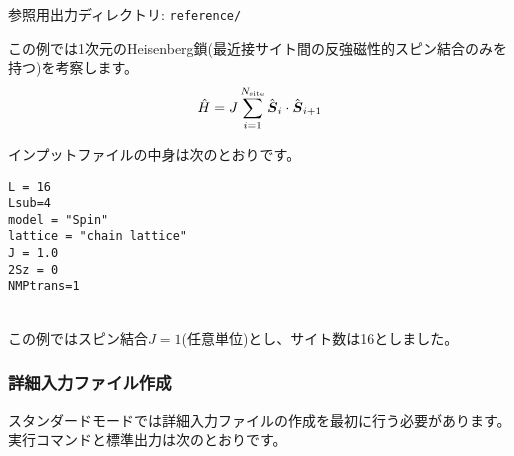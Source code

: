 参照用出力ディレクトリ: \verb|reference/|

この例では1次元のHeisenberg鎖(最近接サイト間の反強磁性的スピン結合のみを持つ)を考察します。
\begin{align}
  {\hat H} = J \sum_{i=1}^{N_{\rm site}} {\hat {\boldsymbol S}}_i \cdot {\hat {\boldsymbol S}}_{i+1}
\end{align}

インプットファイルの中身は次のとおりです。
\\
\begin{minipage}{10cm}
\begin{screen}
\begin{verbatim}
L = 16
Lsub=4
model = "Spin"
lattice = "chain lattice"
J = 1.0
2Sz = 0
NMPtrans=1
\end{verbatim}
\end{screen}
\end{minipage}
%
\\
この例ではスピン結合$J=1$(任意単位)とし、サイト数は16としました。

\subsubsection{詳細入力ファイル作成}
スタンダードモードでは詳細入力ファイルの作成を最初に行う必要があります。
実行コマンドと標準出力は次のとおりです。

